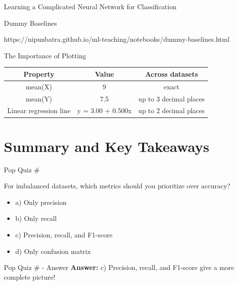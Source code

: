 \documentclass[usenames,dvipsnames]{beamer}
\begin{document}
\begin{frame}{Learning a Complicated Neural Network for Classification}
  \begin{frame}{Dummy Baselines}
	\begin{notebookbox}{https://nipunbatra.github.io/ml-teaching/notebooks/dummy-baselines.html}
	  \end{notebookbox}
\end{frame}

\begin{frame}{The Importance of Plotting}
\begin{tabular}{|c|c|c|}
\hline 
Property & Value & Across datasets \\ 
\hline 
mean(X) & 9 & exact \\ 
mean(Y) & 7.5 & up to 3 decimal places \\ 
Linear regression line & 	y = 3.00 + 0.500x & up to 2 decimal places \\ 
\hline 
\end{tabular} 


\end{frame}

\section{Summary and Key Takeaways}

\begin{frame}{Pop Quiz \#\thepopquiz}
\begin{popquizbox}{\thepopquiz}
For imbalanced datasets, which metrics should you prioritize over accuracy?
\begin{itemize}
	\item a) Only precision
	\item b) Only recall
	\item c) Precision, recall, and F1-score
	\item d) Only confusion matrix
\end{itemize}
\end{popquizbox}
\end{frame}

\begin{frame}{Pop Quiz \#\thepopquiz{} - Answer}
\textbf{Answer:} c) Precision, recall, and F1-score give a more complete picture!
\end{frame}


\end{frame}
\end{document}

